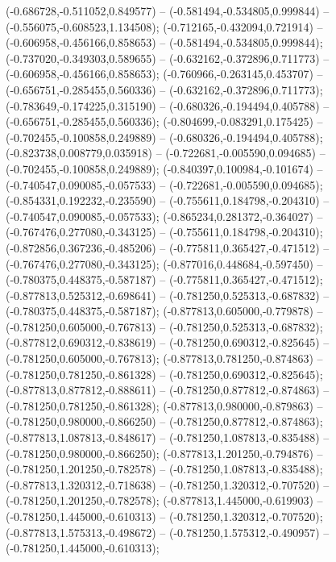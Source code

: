 (-0.686728,-0.511052,0.849577) -- (-0.581494,-0.534805,0.999844) -- (-0.556075,-0.608523,1.134508);
 (-0.712165,-0.432094,0.721914) -- (-0.606958,-0.456166,0.858653) -- (-0.581494,-0.534805,0.999844);
 (-0.737020,-0.349303,0.589655) -- (-0.632162,-0.372896,0.711773) -- (-0.606958,-0.456166,0.858653);
 (-0.760966,-0.263145,0.453707) -- (-0.656751,-0.285455,0.560336) -- (-0.632162,-0.372896,0.711773);
 (-0.783649,-0.174225,0.315190) -- (-0.680326,-0.194494,0.405788) -- (-0.656751,-0.285455,0.560336);
 (-0.804699,-0.083291,0.175425) -- (-0.702455,-0.100858,0.249889) -- (-0.680326,-0.194494,0.405788);
 (-0.823738,0.008779,0.035918) -- (-0.722681,-0.005590,0.094685) -- (-0.702455,-0.100858,0.249889);
 (-0.840397,0.100984,-0.101674) -- (-0.740547,0.090085,-0.057533) -- (-0.722681,-0.005590,0.094685);
 (-0.854331,0.192232,-0.235590) -- (-0.755611,0.184798,-0.204310) -- (-0.740547,0.090085,-0.057533);
 (-0.865234,0.281372,-0.364027) -- (-0.767476,0.277080,-0.343125) -- (-0.755611,0.184798,-0.204310);
 (-0.872856,0.367236,-0.485206) -- (-0.775811,0.365427,-0.471512) -- (-0.767476,0.277080,-0.343125);
 (-0.877016,0.448684,-0.597450) -- (-0.780375,0.448375,-0.587187) -- (-0.775811,0.365427,-0.471512);
 (-0.877813,0.525312,-0.698641) -- (-0.781250,0.525313,-0.687832) -- (-0.780375,0.448375,-0.587187);
 (-0.877813,0.605000,-0.779878) -- (-0.781250,0.605000,-0.767813) -- (-0.781250,0.525313,-0.687832);
 (-0.877812,0.690312,-0.838619) -- (-0.781250,0.690312,-0.825645) -- (-0.781250,0.605000,-0.767813);
 (-0.877813,0.781250,-0.874863) -- (-0.781250,0.781250,-0.861328) -- (-0.781250,0.690312,-0.825645);
 (-0.877813,0.877812,-0.888611) -- (-0.781250,0.877812,-0.874863) -- (-0.781250,0.781250,-0.861328);
 (-0.877813,0.980000,-0.879863) -- (-0.781250,0.980000,-0.866250) -- (-0.781250,0.877812,-0.874863);
 (-0.877813,1.087813,-0.848617) -- (-0.781250,1.087813,-0.835488) -- (-0.781250,0.980000,-0.866250);
 (-0.877813,1.201250,-0.794876) -- (-0.781250,1.201250,-0.782578) -- (-0.781250,1.087813,-0.835488);
 (-0.877813,1.320312,-0.718638) -- (-0.781250,1.320312,-0.707520) -- (-0.781250,1.201250,-0.782578);
 (-0.877813,1.445000,-0.619903) -- (-0.781250,1.445000,-0.610313) -- (-0.781250,1.320312,-0.707520);
 (-0.877813,1.575313,-0.498672) -- (-0.781250,1.575312,-0.490957) -- (-0.781250,1.445000,-0.610313);
